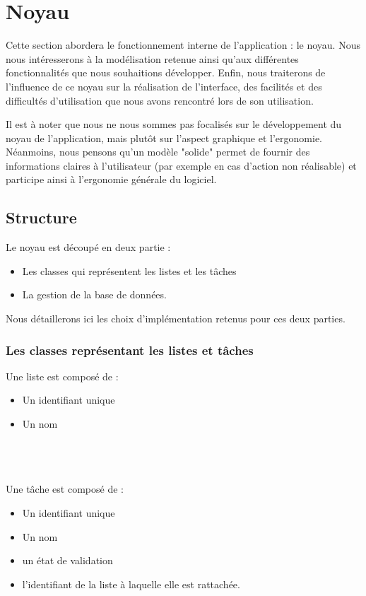 \documentclass[a4paper, 11pt, french]{report}
\begin{document}
\section{Noyau}

Cette section abordera le fonctionnement interne de l'application : le noyau. Nous nous intéresserons à la modélisation retenue ainsi qu'aux différentes fonctionnalités que nous souhaitions développer. Enfin, nous traiterons de l'influence de ce noyau sur la réalisation de l'interface, des facilités et des difficultés d'utilisation que nous avons rencontré lors de son utilisation.
\newline

Il est à noter que nous ne nous sommes pas focalisés sur le développement du noyau de l'application, mais plutôt sur l'aspect graphique et l'ergonomie. Néanmoins, nous pensons qu'un modèle "solide" permet de fournir des informations claires à l'utilisateur (par exemple en cas d'action non réalisable) et participe ainsi à l'ergonomie générale du logiciel.

\subsection{Structure}

Le noyau est découpé en deux partie :
	\begin{itemize}
		\item Les classes qui représentent les listes et les tâches
		\item La gestion de la base de données.
	\end{itemize}
Nous détaillerons ici les choix d'implémentation retenus pour ces deux parties.

\subsubsection{Les classes représentant les listes et tâches}

Une liste est composé de : 
\begin{itemize}
	\item Un identifiant unique
	\item Un nom
\end{itemize}
~\\
~\\
~\\
Une tâche est composé de : 
\begin{itemize}
	\item Un identifiant unique
	\item Un nom
	\item un état de validation
	\item l'identifiant de la liste à laquelle elle est rattachée.
\end{itemize}
~\\
\end{document}
